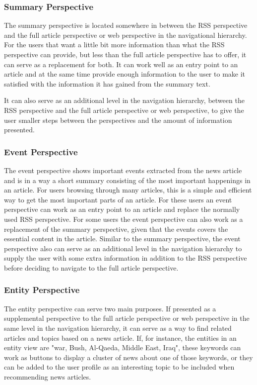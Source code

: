 \subsubsection{Summary Perspective}
The summary perspective is located somewhere in between the RSS perspective and the full article perspective or web perspective in the navigational hierarchy. For the users that want a little bit more information than what the RSS perspective can provide, but less than the full article perspective has to offer, it can serve as a replacement for both. It can work well as an entry point to an article and at the same time provide enough information to the user to make it satisfied with the information it has gained from the summary text. 

It can also serve as an additional level in the navigation hierarchy, between the RSS perspective and the full article perspective or web perspective, to give the user smaller steps between the perspectives and the amount of information presented.

\subsubsection{Event Perspective}
The event perspective shows important events extracted from the news article and is in a way a short summary consisting of the most important happenings in an article. For users browsing through many articles, this is a simple and efficient way to get the most important parts of an article. For these users an event perspective can work as an entry point to an article and replace the normally used RSS perspective. For some users the event perspective can also work as a replacement of the summary perspective, given that the events covers the essential content in the article. Similar to the summary perspective, the event perspective also can serve as an additional level in the navigation hierarchy to supply the user with some extra information in addition to the RSS perspective before deciding to navigate to the full article perspective.

\subsubsection{Entity Perspective}
The entity perspective can serve two main purposes. If presented as a supplemental perspective to the full article perspective or web perspective in the same level in the navigation hierarchy, it can serve as a way to find related articles and topics based on a news article. If, for instance, the entities in an entity view are "war, Bush, Al-Qaeda, Middle East, Iraq", these keywords can work as buttons to display a cluster of news about one of those keywords, or they can be added to the user profile as an interesting topic to be included when recommending news articles.

